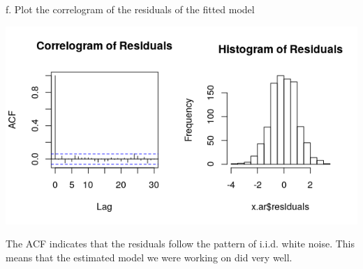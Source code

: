 \documentclass[11pt]{article}
\begin{document}
\\\\
f. Plot the correlogram of the residuals of the fitted model\\
\begin{center}
\includegraphics[scale=1]{2f}
\end{center}
The ACF indicates that the residuals follow the pattern of i.i.d. white noise. This means that the estimated model we were working on did very well.

\newpage
\end{document}
